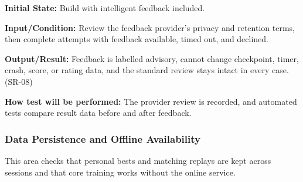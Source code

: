 \documentclass[12pt, titlepage]{article}
\begin{document}
{\begin{enumerate}
\textbf{Initial State:} Build with intelligent feedback included.

\textbf{Input/Condition:} Review the feedback provider's privacy and retention terms,
then complete attempts with feedback available, timed out, and declined.

\textbf{Output/Result:} Feedback is labelled advisory, cannot change checkpoint, timer,
crash, score, or rating data, and the standard review stays intact in every case.
(\mbox{SR-08})

\textbf{How test will be performed:} The provider review is recorded, and automated
tests compare result data before and after feedback.

\end{enumerate}
\par}

\subsubsection{Data Persistence and Offline Availability}

This area checks that personal bests and matching replays are kept across sessions
and that core training works without the online service.
\end{document}
